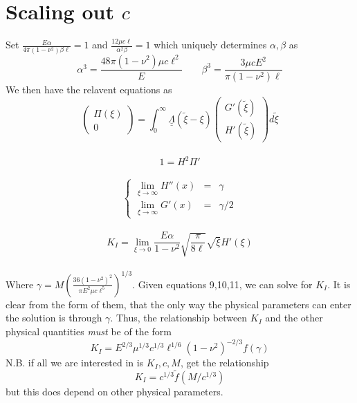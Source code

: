 \documentclass{article}
\begin{document}
\section{Scaling out $c$}
Set $\displaystyle \frac{E\alpha}{4\pi (1-\nu^2)\beta \ell} =1$ 
and $\displaystyle \frac{12\mu c\ell}{\alpha^2 \beta}=1 $
which uniquely determines $\alpha, \beta$ as
\[ \alpha^3 = \frac{48\pi(1-\nu^2) \mu c \ell^2}{E} \qquad
 \beta^3 = \frac{3\mu c E^2}{\pi (1 - \nu^2) \ell} \]
We then have the relavent equations as 
\\
\begin{equation}
 \left( \begin{array}{c} \Pi(\xi) \\ 0 \end{array} \right) =
\int_0^{\infty} 
\underline{\underline{\Lambda}}(\tilde{\xi}- \xi) 
\left( \begin{array}{c} G'(\tilde{\xi}) \\[4pt] H'(\tilde{\xi}) \end{array} 
\right) d\tilde{\xi}
\end{equation}
\\
\begin{equation}
1 = H^2 \Pi'
\end{equation}
\\
\begin{equation}
\left\{ \begin{array}{ccc}
\displaystyle \lim_{\xi\to\infty} H''(x) & = & \gamma \\
\displaystyle \lim_{\xi\to\infty} G'(x) & = & \gamma/2  
\end{array} \right.
\end{equation}
\\
\begin{equation}
K_I = \lim_{\xi\to 0} \frac{E\alpha}{1-\nu^2} \sqrt{\frac{\pi}{8\ell}} 
\sqrt{\xi} H'(\xi)
\end{equation}
\\
Where $\gamma = M \left( \frac{36(1-\nu^2)^2}{\pi E^2 \mu c \ell^5} 
\right)^{1/3}$. Given equations 9,10,11, we can solve for $K_I$. It is 
clear from the form of them, that the only way the physical parameters
can enter the solution is through $\gamma$. Thus, the relationship between
$K_I$ and the other physical quantities \emph{must} be of the form
\[ K_I = E^{2/3} \mu^{1/3} c^{1/3} \ell^{1/6}(1-\nu^2)^{-2/3} f(\gamma) \]
N.B. if all we are interested in is $K_I,c,M$, get the relationship
\[K_I = c^{1/3} \tilde{f}(M/c^{1/3}) \]
but this does depend on other physical parameters.
\end{document}
